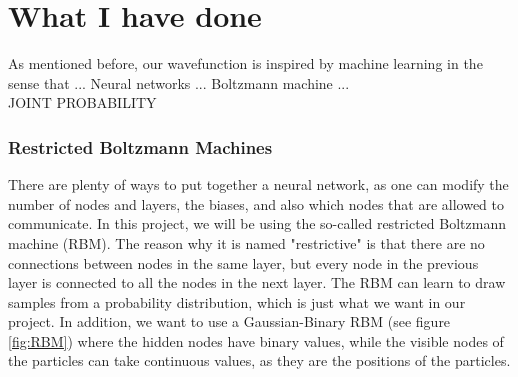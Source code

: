 \section{What I have done} \label{sec:wihd}
As mentioned before, our wavefunction is inspired by machine learning in the sense that ... Neural networks ... Boltzmann machine ... \\
JOINT PROBABILITY\\

\iffalse
\subsubsection{Restricted Boltzmann Machines} \label{sec:RBM}
There are plenty of ways to put together a neural network, as one can modify the number of nodes and layers, the biases, and also which nodes that are allowed to communicate. In this project, we will be using the so-called restricted Boltzmann machine (RBM). The reason why it is named "restrictive" is that there are no connections between nodes in the same layer, but every node in the previous layer is connected to all the nodes in the next layer. The RBM can learn to draw samples from a probability distribution, which is just what we want in our project. In addition, we want to use a Gaussian-Binary RBM (see figure \ref{fig:RBM}) where the hidden nodes have binary values, while the visible nodes of the particles can take continuous values, as they are the positions of the particles. 

